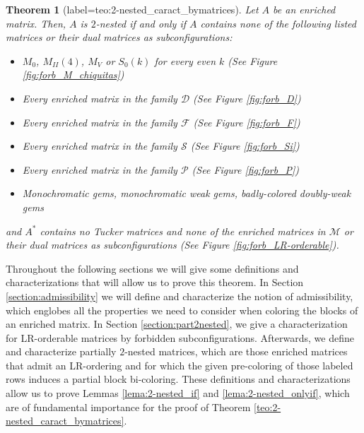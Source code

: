 \documentclass[12pt]{book}
\theoremstyle{plain}
\newtheorem{teo}{Theorem}[chapter]
\theoremstyle{remark}
\begin{document}
\begin{teo}[label={teo:2-nested_caract_bymatrices}]
	Let $A$ be an enriched matrix. Then, $A$ is $2$-nested if and only if $A$ contains none of the following listed matrices or their dual matrices as subconfigurations: 
	\begin{itemize}		
	\item $M_0$, $M_{II}(4)$, $M_V$ or $S_0(k)$ for every even $k$ (See Figure \ref{fig:forb_M_chiquitas})
	\item Every enriched matrix in the family $\mathcal{D}$ (See Figure \ref{fig:forb_D}) %
	\item Every enriched matrix in the family $\mathcal{F}$ (See Figure \ref{fig:forb_F}) %
	\item Every enriched matrix in the family $\mathcal{S}$ (See Figure \ref{fig:forb_Si})
	\item Every enriched matrix in the family $\mathcal{P}$ (See Figure \ref{fig:forb_P})
	\item Monochromatic gems, monochromatic weak gems, badly-colored doubly-weak gems 
	\end{itemize}
and $A^*$ contains no Tucker matrices and none of the enriched matrices in $\mathcal{M}$ or their dual matrices as subconfigurations (See Figure \ref{fig:forb_LR-orderable}).

\end{teo} 

Throughout the following sections we will give some definitions and characterizations that will allow us to prove this theorem. In Section \ref{section:admissibility} we will define and characterize the notion of admissibility, which englobes all the properties we need to consider when coloring the blocks of an enriched matrix. In Section \ref{section:part2nested}, we give a characterization for LR-orderable matrices by forbidden subconfigurations. Afterwards, we define and characterize partially $2$-nested matrices, which are those enriched matrices that admit an LR-ordering and for which the given pre-coloring of those labeled rows induces a partial block bi-coloring.
These definitions and characterizations allow us to prove Lemmas \ref{lema:2-nested_if} and \ref{lema:2-nested_onlyif}, which are of fundamental importance for the proof of Theorem \ref{teo:2-nested_caract_bymatrices}. 
\end{document}
